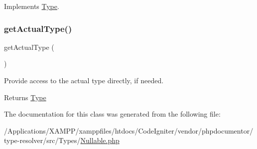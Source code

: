 Implements \mbox{\hyperlink{interfacephp_documentor_1_1_reflection_1_1_type_a7516ca30af0db3cdbf9a7739b48ce91d}{Type}}.

\mbox{\label{classphp_documentor_1_1_reflection_1_1_types_1_1_nullable_aa527e33318eb1d11f78d387f5d888e36}} 
\subsubsection{\texorpdfstring{get\+Actual\+Type()}{getActualType()}}
{\footnotesize\ttfamily get\+Actual\+Type (\begin{DoxyParamCaption}{ }\end{DoxyParamCaption})}

Provide access to the actual type directly, if needed.

\begin{DoxyReturn}{Returns}
\mbox{\hyperlink{interfacephp_documentor_1_1_reflection_1_1_type}{Type}} 
\end{DoxyReturn}


The documentation for this class was generated from the following file\+:\begin{DoxyCompactItemize}
\item 
/\+Applications/\+X\+A\+M\+P\+P/xamppfiles/htdocs/\+Code\+Igniter/vendor/phpdocumentor/type-\/resolver/src/\+Types/\mbox{\hyperlink{_nullable_8php}{Nullable.\+php}}\end{DoxyCompactItemize}
